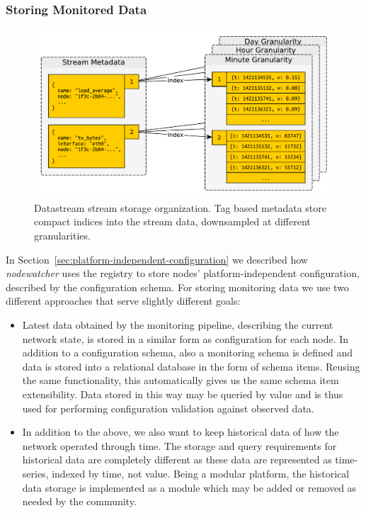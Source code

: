 \documentclass[5p,sort&compress]{elsarticle}
\newcommand{\nodewatcher}{\textit{nodewatcher}}
\begin{document}
\subsubsection{Storing Monitored Data}

\begin{figure}
  \centering
  \includegraphics[scale=0.4]{figures/datastream-storage.pdf}
  \caption{Datastream stream storage organization. Tag based metadata store compact indices into the stream data, downsampled at different granularities.}
  \label{fig:datastream-storage}
\end{figure}

In Section~\ref{sec:platform-independent-configuration} we described how \nodewatcher{} uses the registry to store nodes' platform-independent configuration, described by the configuration schema.
For storing monitoring data we use two different approaches that serve slightly different goals:
\begin{itemize}
\item Latest data obtained by the monitoring pipeline, describing the current network state, is stored in a similar form as configuration for each node.
In addition to a configuration schema, also a monitoring schema is defined and data is stored into a relational database in the form of schema items.
Reusing the same functionality, this automatically gives us the same schema item extensibility.
Data stored in this way may be queried by value and is thus used for performing configuration validation against observed data.

\item In addition to the above, we also want to keep historical data of how the network operated through time.
The storage and query requirements for historical data are completely different as these data are represented as time-series, indexed by time, not value.
Being a modular platform, the historical data storage is implemented as a module which may be added or removed as needed by the community.
\end{itemize}
\end{document}
